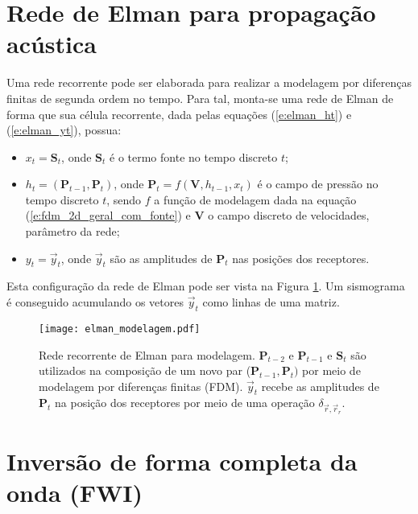   \section{Rede de Elman para propagação acústica} \label{s:rnn_modelagem}

    Uma rede recorrente pode ser elaborada para realizar a modelagem por diferenças finitas de segunda ordem no tempo. %
    Para tal, monta-se uma rede de Elman de forma que sua célula recorrente, dada pelas equações (\ref{e:elman_ht}) e (\ref{e:elman_yt}), possua:

    \begin{itemize}
      \item $x_t = \boldsymbol{S}_{t}$, onde $\boldsymbol{S}_t$ é o termo fonte no tempo discreto $t$;
      \item $h_t = (\boldsymbol{P}_{t-1}, \boldsymbol{P}_{t})$, onde $\boldsymbol{P}_{t} = f(\boldsymbol{V},h_{t-1}, x_t)$ é o campo de pressão no tempo discreto $t$, sendo $f$ a função de modelagem dada na equação (\ref{e:fdm_2d_geral_com_fonte}) e $\boldsymbol{V}$ o campo discreto de velocidades, parâmetro da rede;
      \item $y_t = \vec{y}_t$, onde $\vec{y}_t$ são as amplitudes de $\boldsymbol{P}_{t}$ nas posições dos receptores.
    \end{itemize}

    \noindent Esta configuração da rede de Elman pode ser vista na Figura \ref{f:elman_modelagem}. Um sismograma é conseguido acumulando os vetores $\vec{y}_t$ como linhas de uma matriz.

      \begin{figure}
        \begin{center}
          \texttt{[image: elman\_modelagem.pdf]}
        \end{center}
        \caption{Rede recorrente de Elman para modelagem. $\boldsymbol{P}_{t-2}$ e $\boldsymbol{P}_{t-1}$ e $\boldsymbol{S}_t$ são utilizados na composição de um novo par ($\boldsymbol{P}_{t-1}, \boldsymbol{P}_{t})$ por meio de modelagem por diferenças finitas (FDM). $\vec{y}_t$ recebe as amplitudes de $\boldsymbol{P}_{t}$ na posição dos receptores por meio de uma operação $\delta_{\vec{r}, \vec{r}_r}$.}
        \label{f:elman_modelagem}
      \end{figure}

  \section{Inversão de forma completa da onda (FWI)}

